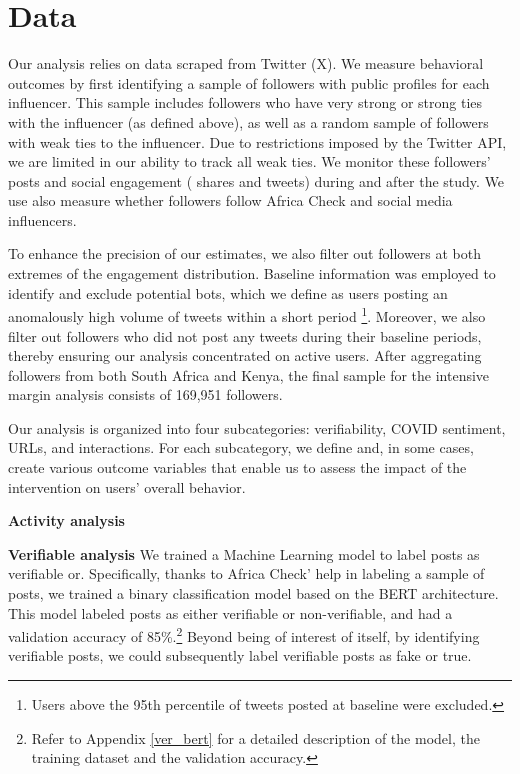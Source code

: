 \section{Data}

Our analysis relies on data scraped from Twitter (X). We measure behavioral outcomes by first identifying a sample of followers with public profiles for each influencer. This sample includes followers who have very strong or strong ties with the influencer (as defined above), as well as a random sample of followers with weak ties to the influencer. Due to restrictions imposed by the Twitter API, we are limited in our ability to track all weak ties. We monitor these followers' posts and social engagement (%
shares and tweets) during and after the study. 
We use also measure whether followers follow Africa Check and social media influencers.

To enhance the precision of our estimates, we also filter out followers at both extremes of the engagement distribution. Baseline information was employed to identify and exclude potential bots, which we define as users posting an anomalously high volume of tweets within a short period \footnote{Users above the 95th percentile of tweets posted at baseline were excluded.}. Moreover, we also filter out followers who did not post any tweets during their baseline periods, thereby ensuring our analysis concentrated on active users. After aggregating followers from both South Africa and Kenya, the final sample for the intensive margin analysis consists of 169,951 followers.

Our analysis is organized into four subcategories: verifiability, COVID sentiment, URLs, and interactions. For each subcategory, we define and, in some cases, create various outcome variables that enable us to assess the impact of the intervention on users' overall behavior.

\textbf{Activity analysis}

\textbf{Verifiable analysis} %
We trained a Machine Learning model to label posts as verifiable or. Specifically, thanks to Africa Check' help in labeling a sample of posts, we trained a binary classification model based on the BERT architecture. This model labeled posts as either verifiable or non-verifiable, and had a validation accuracy of 85\%.\footnote{Refer to Appendix \ref{ver_bert} for a detailed description of the model, the training dataset and the validation accuracy.} Beyond being of interest of itself, by identifying verifiable posts, we could subsequently label verifiable posts as fake or true. 


